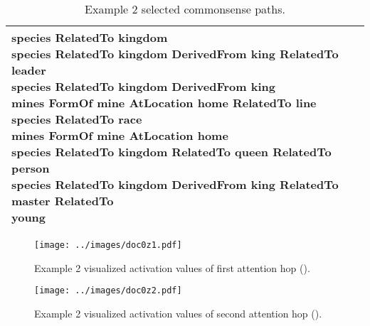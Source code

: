 \documentclass[11pt,a4paper]{article}
\begin{document}
\begin{table*}[ht]
\begin{small}
\begin{tabular}{|p{}|p{}|}
{species  RelatedTo  kingdom\\
species  RelatedTo  kingdom  DerivedFrom  king  RelatedTo  leader\\
species  RelatedTo  kingdom  DerivedFrom  king\\
mines  FormOf  mine  AtLocation  home  RelatedTo  line\\
\textbf{species  RelatedTo  race}\\
mines  FormOf  mine  AtLocation  home\\
species  RelatedTo  kingdom  RelatedTo  queen  RelatedTo  person\\
species  RelatedTo  kingdom  DerivedFrom  king  RelatedTo  master  RelatedTo \\  young}\\
\hline
  \end{tabular}
 \caption{Example 2 selected commonsense paths.}
 \label{tab:extractedex2}
 \end{small}
\end{table*}
\begin{figure*}[h]
  \centering
  \texttt{[image: ../images/doc0z1.pdf]}
 \caption{Example 2 visualized activation values of first attention hop ().}
\end{figure*}
\begin{figure*}[h]
  \centering
  \texttt{[image: ../images/doc0z2.pdf]}
 \caption{Example 2 visualized activation values of second attention hop ().}

\end{figure*}
\end{document}
